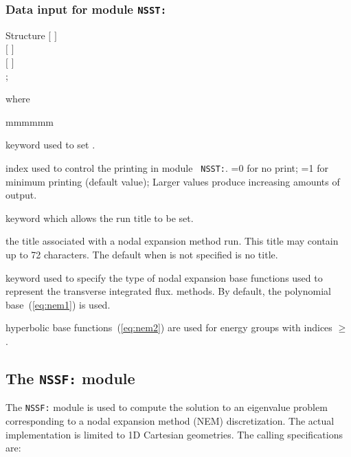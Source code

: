 \clearpage

\subsubsection{Data input for module {\tt NSST:}}\label{sect:NSST_data}

\begin{DataStructure}{Structure }
$[$   $]$ \\
$[$   $]$ \\
$[$   $]$ \\
;
\end{DataStructure}

\noindent where
\begin{ListeDeDescription}{mmmmmm}

\item[\moc{EDIT}] keyword used to set .

\item[\dusa{iprint}] index used to control the printing  in module {\tt
NSST:}. =0 for no print; =1 for minimum printing (default value); Larger
values produce increasing amounts of output.

\item[\moc{TITL}] keyword which allows the run title to be set.

\item[\dusa{TITLE}] the title associated with a nodal expansion method run. This
title may contain up to 72 characters. The default when  is not specified is no title.

\item[\moc{HYPE}] keyword used to specify the type of nodal expansion base functions used to represent the transverse integrated flux.
methods. By default, the polynomial base~(\ref{eq:nem1}) is used.

\item[\dusa{igmax}] hyperbolic base functions~(\ref{eq:nem2}) are used for energy groups with indices $\ge$ .

\end{ListeDeDescription}

\clearpage

\subsection{The {\tt NSSF:} module}

The {\tt NSSF:} module is used to compute the solution to an eigenvalue problem corresponding to a nodal expansion method (NEM) discretization. The actual implementation is limited to
1D Cartesian geometries. The calling specifications are:


